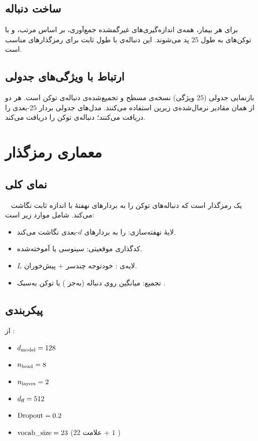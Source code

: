 \subsection{ساخت دنباله}

برای هر بیمار، همه‌ی اندازه‌گیری‌های غیرگمشده جمع‌آوری، بر اساس  مرتب، و با توکن‌های  به طول $25$ پد می‌شوند. این دنباله‌ی با طول ثابت برای رمزگذارهای  مناسب است.

\subsection{ارتباط با ویژگی‌های جدولی}

بازنمایی جدولی ($25$ ویژگی) نسخه‌ی مسطح و تجمیع‌شده‌ی دنباله‌ی توکن است. هر دو از همان مقادیر نرمال‌شده‌ی زیرین استفاده می‌کنند. مدل‌های جدولی بردار $25$-بعدی را دریافت می‌کنند؛  دنباله‌ی توکن را دریافت می‌کند.

\section{معماری رمزگذار }

\subsection{نمای کلی}

~\cite{sharafi2023ethos} یک رمزگذار  است که دنباله‌های توکن را به بردارهای نهفتۀ با اندازه ثابت نگاشت می‌کند. شامل موارد زیر است:
\begin{itemize}
\item لایۀ نهفته‌سازی:  را به بردارهای $d$-بعدی نگاشت می‌کند.
\item کدگذاری موقعیتی: سینوسی یا آموخته‌شده.
\item $L$ لایه‌ی : خودتوجه چندسر + پیش‌خوران.
\item تجمیع: میانگین روی دنباله (به‌جز ) یا توکن به‌سبک \lr{[CLS]}.
\end{itemize}

\subsection{پیکربندی}

از \texttt{}:
\begin{itemize}
\item $d_{\text{model}} = 128$
\item $n_{\text{head}} = 8$
\item $n_{\text{layers}} = 2$
\item $d_{\text{ff}} = 512$
\item $\text{Dropout} = 0.2$
\item $\text{vocab\_size} = 23$ ($22$ علامت + $1$ )
\end{itemize}


